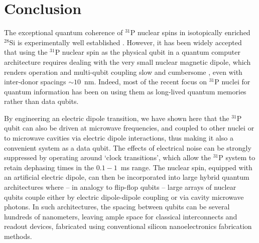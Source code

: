 \section{Conclusion} \label{sec:conclusion}

The exceptional quantum coherence of $^{31}$P nuclear spins in isotopically enriched $^{28}$Si is experimentally well established \cite{Saeedi2013,Muhonen2014}. However, it has been widely accepted that using the $^{31}$P nuclear spin as the physical qubit in a quantum computer architecture requires dealing with the very small nuclear magnetic dipole, which renders operation and multi-qubit coupling slow and cumbersome \cite{Kane1998,OGorman2016,Hill2015}, even with inter-donor spacings $\sim 10$~nm. Indeed, most of the recent focus on $^{31}$P nuclei for quantum information has been on using them as long-lived quantum memories \cite{Morton2008,Freer2017} rather than data qubits. 

By engineering an electric dipole transition, we have shown here that the $^{31}$P qubit can also be driven at microwave frequencies, and coupled to other nuclei or to microwave cavities via electric dipole interactions, thus making it also a convenient system as a data qubit. The effects of electrical noise can be strongly suppressed by operating around `clock transitions', which allow the $^{31}$P system to retain dephasing times in the $0.1 - 1$~ms range. The nuclear spin, equipped with an artificial electric dipole, can then be incorporated into large hybrid quantum architectures \cite{Xiang2012} where -- in analogy to flip-flop qubits \cite{Tosi2017} -- large arrays of nuclear qubits couple either by electric dipole-dipole coupling or via cavity microwave photons. In such architectures, the spacing between qubits can be several hundreds of nanometers, leaving ample space for classical interconnects \cite{Fisher2015,Franke2018} and readout devices, fabricated using conventional silicon nanoelectronics fabrication methods.